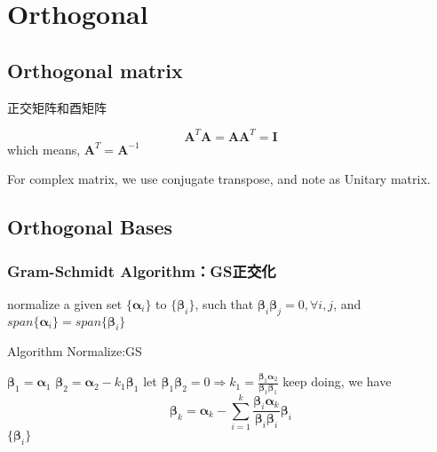 \documentclass[UTF8]{../../09-Mathematics}
\begin{document}
\chapter{Orthogonal}


\section{Orthogonal matrix}

正交矩阵和酉矩阵

$$
\boldsymbol{A}^T\boldsymbol{A} = \boldsymbol{A}\boldsymbol{A} ^T = \boldsymbol{I}
$$
which means, $\boldsymbol{A}^T = \boldsymbol{A} ^{-1}$

For complex matrix, we use conjugate transpose, and note as Unitary matrix.


\section{Orthogonal Bases}

\subsection{Gram-Schmidt Algorithm：GS正交化}



normalize a given set $\{ \boldsymbol \alpha_i\}$ to $\{\boldsymbol  \beta_i\}$, such that $\boldsymbol  \beta_i \boldsymbol  \beta_j = 0, \forall i,j$, and $span\{ \boldsymbol \alpha_i\} = span\{ \boldsymbol \beta_i\}$

\begin{algorithm}[H]
    \caption{Algorithm Normalize:GS}\label{algo:Normalize:GS}
    \SetAlgoLined
    $\boldsymbol \beta _1 = \boldsymbol \alpha _1$\;
    $\boldsymbol \beta _2 = \boldsymbol \alpha _2 - k_1 \boldsymbol  \beta _1$\;
    let $\boldsymbol \beta _1 \boldsymbol \beta _2 = 0 \Rightarrow k_1 = \frac{\boldsymbol \beta _1 \boldsymbol \alpha _2}{ \boldsymbol \beta _1 \boldsymbol \beta _1}$\;
    keep doing, we have
    $$\boldsymbol  \beta _k = \boldsymbol \alpha _k-\sum_{i=1}^{k}\frac{\boldsymbol \beta _i \boldsymbol \alpha _k}{\boldsymbol \beta _i \boldsymbol \beta _i} \boldsymbol \beta _i$$
    \KwRet $\{\boldsymbol  \beta_i\}$\;
\end{algorithm}
\end{document}
